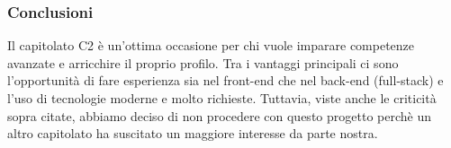 \subsubsection{Conclusioni}
Il capitolato C2 è un’ottima occasione per chi vuole imparare competenze avanzate 
e arricchire il proprio profilo. Tra i vantaggi principali ci sono l’opportunità 
di fare esperienza sia nel front-end che nel back-end (full-stack) e l’uso di 
tecnologie moderne e molto richieste. Tuttavia, viste anche le criticità sopra citate, 
abbiamo deciso di non procedere con questo progetto perchè un altro capitolato ha 
suscitato un maggiore interesse da parte nostra.
